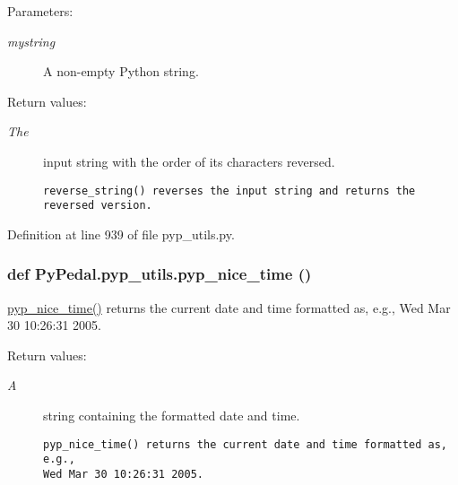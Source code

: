 \begin{Desc}
\item[Parameters:]
\begin{description}
\item[{\em mystring}]A non-empty Python string. \end{description}
\end{Desc}
\begin{Desc}
\item[Return values:]
\begin{description}
\item[{\em The}]input string with the order of its characters reversed.

\footnotesize\begin{verbatim}reverse_string() reverses the input string and returns the reversed version.
\end{verbatim}
\normalsize
 \end{description}
\end{Desc}


Definition at line 939 of file pyp\_\-utils.py.\hypertarget{namespacePyPedal_1_1pyp__utils_d0f48a5eff86a5ec95476497b9e133ef}{
\subsubsection[pyp\_\-nice\_\-time]{\setlength{\rightskip}{0pt plus 5cm}def Py\-Pedal.pyp\_\-utils.pyp\_\-nice\_\-time ()}}
\label{namespacePyPedal_1_1pyp__utils_d0f48a5eff86a5ec95476497b9e133ef}


\hyperlink{namespacePyPedal_1_1pyp__utils_d0f48a5eff86a5ec95476497b9e133ef}{pyp\_\-nice\_\-time()} returns the current date and time formatted as, e.g., Wed Mar 30 10:26:31 2005. 

\begin{Desc}
\item[Return values:]
\begin{description}
\item[{\em A}]string containing the formatted date and time.

\footnotesize\begin{verbatim}pyp_nice_time() returns the current date and time formatted as, e.g.,
Wed Mar 30 10:26:31 2005.
\end{verbatim}
\normalsize
 \end{description}
\end{Desc}


